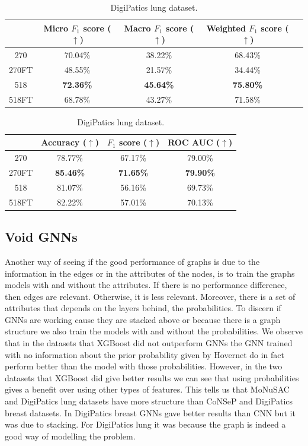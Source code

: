 \begin{table}[ht]
\vspace{0.5cm}

\begin{tabular}{c|c|c|c|c|}
  \cline{2-4}
  & Micro $F_1$ score ($\uparrow$) & Macro $F_1$ score ($\uparrow$) & Weighted $F_1$ score ($\uparrow$) \\ \hline
\multicolumn{1}{|c|}{270}  & 70.04\% & 38.22\% & 68.43\%  \\ \hline
\multicolumn{1}{|c|}{270FT}  & 48.55\% & 21.57\% & 34.44\% \\ \hline
\multicolumn{1}{|c|}{518}  & \textbf{72.36\%} & \textbf{45.64\%} & \textbf{75.80\%} \\ \hline
\multicolumn{1}{|c|}{518FT}  & 68.78\% & 43.27\% & 71.58\% \\ \hline
\end{tabular}
\caption{DigiPatics breast dataset.}

\vspace{0.5cm}

\begin{tabular}{c|c|c|c|}
  \cline{2-4}
  & Accuracy ($\uparrow$) & $F_1$ score ($\uparrow$) & ROC AUC ($\uparrow$)  \\ \hline
\multicolumn{1}{|c|}{270}  & 78.77\% & 67.17\% & 79.00\% \\ \hline
\multicolumn{1}{|c|}{270FT}  & \textbf{85.46\%} & \textbf{71.65\%} & \textbf{79.90\%} \\ \hline
\multicolumn{1}{|c|}{518}  & 81.07\% & 56.16\% & 69.73\% \\ \hline
\multicolumn{1}{|c|}{518FT}  & 82.22\% & 57.01\% & 70.13\% \\ \hline
\end{tabular}
\caption{DigiPatics lung dataset.}
    \label{tab:scaling}
\end{table}

\newpage
\subsection{Void GNNs}

Another way of seeing if the good performance of graphs is due to the information in the edges or in the attributes of the nodes, is to train the graphs models with and without the attributes. If there is no performance difference, then edges are relevant. Otherwise, it is less relevant. Moreover, there is a set of attributes that depends on the layers behind, the probabilities. To discern if GNNs are working cause they are stacked above or because there is a graph structure we also train the models with and without the probabilities. We observe that in the datasets that XGBoost did not outperform GNNs the GNN trained with no information about the prior probability given by Hovernet do in fact perform better than the model with those probabilities. However, in the two datasets that XGBoost did give better results we can see that using probabilities gives a benefit over using other types of features. This tells us that MoNuSAC and DigiPatics lung datasets have more structure than CoNSeP and DigiPatics breast datasets. In DigiPatics breast GNNs gave better results than CNN but it was due to stacking. For DigiPatics lung it was because the graph is indeed a good way of modelling the problem. 

